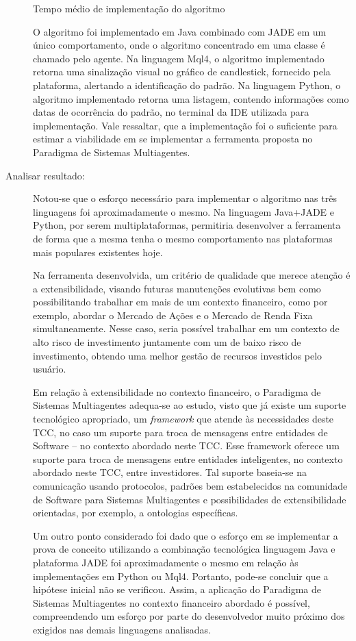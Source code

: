\begin{description}
\begin{table}[h]
	\caption{Tempo médio de implementação do algoritmo}
\end{table}

O algoritmo foi implementado em Java combinado com JADE em um único comportamento, onde o algoritmo concentrado em uma classe é chamado pelo agente. Na linguagem Mql4, o algoritmo implementado retorna uma sinalização visual no gráfico de candlestick, fornecido pela plataforma, alertando a identificação do padrão. Na linguagem Python, o algoritmo implementado retorna uma listagem, contendo informações como datas de ocorrência do padrão, no terminal da IDE utilizada para implementação. Vale ressaltar, que a implementação foi o suficiente para estimar a viabilidade em se implementar a ferramenta proposta no Paradigma de Sistemas Multiagentes.

\item [Analisar resultado:]
Notou-se que o esforço necessário para implementar o algoritmo nas três linguagens foi aproximadamente o mesmo. Na linguagem Java+JADE e Python, por serem multiplataformas, permitiria desenvolver a ferramenta de forma que a mesma tenha o mesmo comportamento nas plataformas mais populares existentes hoje.

Na ferramenta desenvolvida, um critério de qualidade que merece atenção é a extensibilidade, visando futuras manutenções evolutivas bem como possibilitando trabalhar em mais de um contexto financeiro, como por exemplo, abordar o Mercado de Ações e o Mercado de Renda Fixa simultaneamente. Nesse caso, seria possível trabalhar em um contexto de alto risco de investimento juntamente com um de baixo risco de investimento, obtendo uma melhor gestão de recursos investidos pelo usuário.

Em relação à extensibilidade no contexto financeiro, o Paradigma de Sistemas Multiagentes adequa-se ao estudo, visto que já existe um suporte tecnológico apropriado, um \textit{framework} que atende às necessidades deste TCC, no caso um suporte para troca de mensagens entre entidades de Software – no contexto abordado neste TCC. Esse framework oferece um suporte para troca de mensagens entre entidades inteligentes, no contexto abordado neste TCC, entre investidores. Tal suporte baseia-se na comunicação usando protocolos, padrões bem estabelecidos na comunidade de Software para Sistemas Multiagentes e possibilidades de extensibilidade orientadas, por exemplo, a ontologias específicas.

Um outro ponto considerado foi dado que o esforço em se implementar a prova de conceito utilizando a combinação tecnológica linguagem Java e plataforma JADE foi aproximadamente o mesmo em relação às implementações em Python ou Mql4. Portanto, pode-se concluir que a hipótese inicial não se verificou. Assim, a aplicação do Paradigma de Sistemas Multiagentes no contexto financeiro abordado é possível, compreendendo um esforço por parte do desenvolvedor muito próximo dos exigidos nas demais linguagens analisadas.


\end{description}
